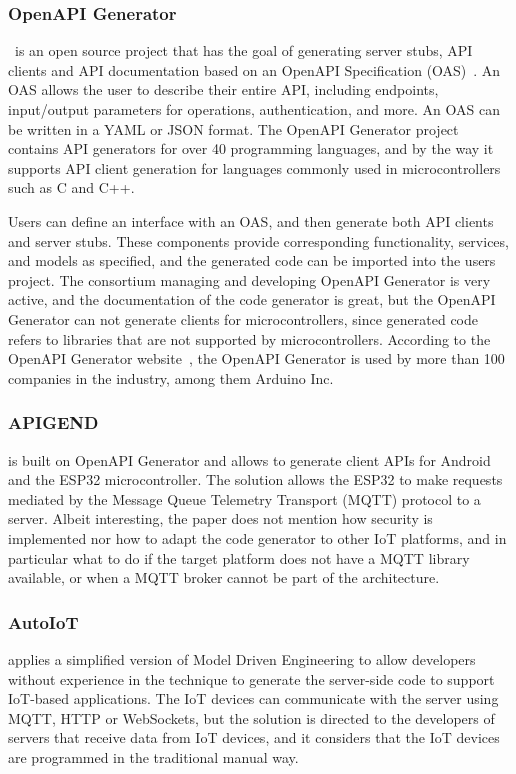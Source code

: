 \documentclass[manuscript,screen]{acmart}
\begin{document}
\subsubsection{OpenAPI Generator}
\cite{WhatIsOpenAPI}~is an open source project that has the goal of generating server stubs, API clients and API documentation based on an OpenAPI Specification (OAS)~\cite{OpenAPISpecificationDesc}. An OAS allows the user to describe their entire API, including endpoints, input/output parameters for operations, authentication, and more. An OAS can be written in a YAML or JSON format. The OpenAPI Generator project contains API generators for over 40 programming languages, and by the way it supports API client generation for languages commonly used in microcontrollers such as C and C++. 

Users can define an interface with an OAS, and then generate both API clients and server stubs. These components provide corresponding functionality, services, and models as specified, and the generated code can be imported into the users project. The consortium managing and developing OpenAPI Generator is very active, and the documentation of the code generator is great, but the OpenAPI Generator can not generate clients for microcontrollers, since generated code refers to libraries that are not supported by microcontrollers. According to the OpenAPI Generator website~\cite{OpenAPIGeneratorUsers}, the OpenAPI Generator is used by more than 100 companies in the industry, among them Arduino Inc.


\subsubsection{APIGEND}
\cite{laso2020deployment} is built on OpenAPI Generator and allows to generate client APIs for Android and the ESP32 microcontroller. The solution allows the ESP32 to make requests mediated by the Message Queue Telemetry Transport (MQTT) protocol to a server. Albeit interesting, the paper does not mention how security is implemented nor how to adapt the code generator to other IoT platforms, and in particular what to do if the target platform does not have a MQTT library available, or when a MQTT broker cannot be part of the architecture. 


\subsubsection{AutoIoT}
\cite{nepomuceno2020autoiot} applies a simplified version of Model Driven Engineering to allow developers without experience in the technique to generate the server-side code to support IoT-based applications. The IoT devices can communicate with the server using MQTT, HTTP or WebSockets, but the solution is directed to the developers of servers that receive data from IoT devices, and it considers that the IoT devices are programmed in the traditional manual way. 
\end{document}
